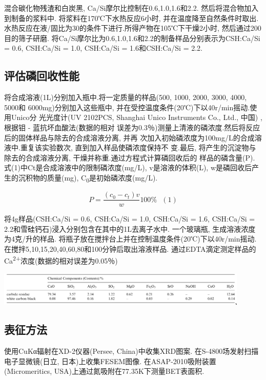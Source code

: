 \documentclass[11pt]{article}
\begin{document}
混合碳化物残渣和白炭黑, Ca/Si摩尔比控制在0.6,1.0,1.6和2.2. 然后将混合物加入到制备的浆料中. 将浆料在170℃下水热反应6小时, 并在温度降至自然条件时取出. 水热反应在液/固比为30的条件下进行.所得产物在105℃下干燥2小时, 然后通过200目的筛子研磨. 将Ca/Si摩尔比为0.6,1.0,1.6和2.2的制备样品分别表示为CSH:Ca/Si = 0.6, CSH:Ca/Si = 1.0, CSH:Ca/Si = 1.6和CSH:Ca/Si = 2.2.
\subsection{评估磷回收性能}
\label{sec:org8f4b62f}
将合成溶液(1L)分别加入瓶中.将一定质量的样品(500, 1000, 2000, 3000, 4000, 5000和
6000mg)分别加入这些瓶中, 并在受控温度条件(20℃)下以40r/min摇动.使用Unico分
光光度计(UV 2102PCS, Shanghai Unico Instruments Co., Ltd., 中国)
\cite{gustafsson08_phosp_remov_by_miner_based} , 根据钼 - 蓝抗坏血酸法(数据的相对
误差为0.3％)测量上清液的磷浓度.然后将反应后的固体样品与除去的合成溶液分离, 并再
次加入初始磷浓度为100mg/L的合成溶液中.重复该实验数次, 直到加入样品使磷浓度保持不
变.最后, 将产生的沉淀物与除去的合成溶液分离, 干燥并称重.通过方程式计算磷回收后的
样品的磷含量(P). 式(1)中Ct是合成溶液中的限制磷浓度(mg/L), v是溶液的体积(L), w是磷回收后产生的沉积物的质量(mg), C\textsubscript{0}是初始磷浓度(mg/L).

\[P = \frac{(c_{0} - c_{t})v}{w} 100\% \ \ \  (1)\]

将4g样品(CSH:Ca/Si = 0.6, CSH:Ca/Si = 1.0, CSH:Ca/Si = 1.6, CSH:Ca/Si = 2.2和雪硅钙石)浸入分别包含在其中的1L去离子水中. 一个玻璃瓶, 生成溶液浓度为4克/升的样品. 将瓶子放在搅拌台上并在控制温度条件(20℃)下以40r/min摇动. 在搅拌5,10,15,20,40,60,80和100分钟后取出溶液样品. 通过EDTA滴定测定样品的Ca\textsuperscript{2+}浓度(数据的相对误差为0.05％)\cite{kim03_effec_ph_sulfat_sodium_edta_titrat_calcium}


\includegraphics[width=0.9\textwidth]{table.1.new.png}
 \label{tab:title}

\subsection{表征方法}
\label{sec:orgb09fcc6}
使用CuKα辐射在XD-2仪器(Persee, China)中收集XRD图案. 在S-4800场发射扫描电子显微镜(日立, 日本)上收集FESEM图像. 在ASAP-2010吸附装置(Micromeritics, USA)上通过氮吸附在77.35K下测量BET表面积.
\end{document}
